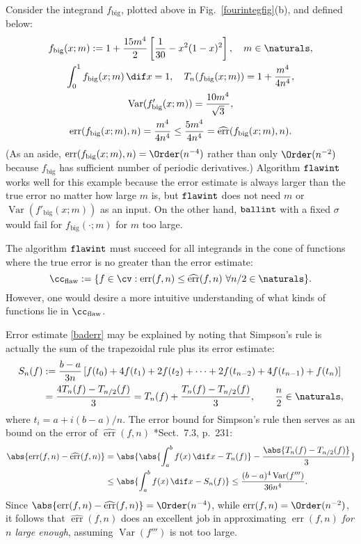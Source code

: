 \documentclass[]{article}
\DeclareMathOperator{\flawinteg}{\texttt{\textup{flawint}}}
\DeclareMathOperator{\ballinteg}{\texttt{\textup{ballint}}}
\DeclareMathOperator{\Var}{Var}
\DeclareMathOperator{\err}{err}
\newcommand{\herr}{\widehat{\err}}
\theoremstyle{definition}
\theoremstyle{remark}
\begin{document}
Consider the integrand $f_{\text{big}}$, plotted above in Fig.\ \ref{fourintegfig}(b), and defined below:
\begin{subequations} \label{fbig}
\begin{gather} 
f_{\text{big}}(x;m) :=  1 + \frac{15 m^4}{2} \left[ \frac{1}{30} - x^2(1-x)^2 \right], \quad m \in \naturals, \\
\int_0^1 f_{\text{big}}(x;m) \, \dif x =  1, \quad T_{n}(f_{\text{big}}(x;m))= 1 + \frac{m^4}{4n^4},  \\
\Var(f'_{\text{big}}(x;m)) = \frac{10 m^4}{\sqrt{3}},  \\ \err(f_{\text{big}}(x;m),n)=\frac{m^4}{4n^4} \le \frac{5m^4}{4n^4} = \herr(f_{\text{big}}(x;m),n).
\end{gather}
\end{subequations}
(As an aside, $\err(f_{\text{big}}(x;m),n) = \Order (n^{-4})$ rather than only $\Order (n^{-2})$ because $f_{\text{big}}$ has sufficient number of periodic  derivatives.)  Algorithm $\flawinteg$ works well for this example because the error estimate is always larger than the true error no matter how large $m$ is, but $\flawinteg$ does not need $m$ or $\Var(f'_{\text{big}}(x;m))$ as an input.  On the other hand, $\ballinteg$ with a fixed $\sigma$ would fail for $f_{\text{big}}(\cdot; m)$ for $m$ too large.

The algorithm $\flawinteg$ must succeed for all integrands in the cone of functions where the true error is no greater than the error estimate:
\begin{equation*} 
\cc_{\text{flaw}} : = \{f \in \cv : \err(f,n) \le \herr(f,n) \ \forall n/2 \in \naturals\}.
\end{equation*}
However, one would desire a more intuitive understanding of what kinds of functions lie in $\cc_{\text{flaw}}$.

Error estimate \eqref{baderr} may be explained by noting that Simpson's rule is actually the sum of the trapezoidal rule plus its error estimate:
\begin{align*}
S_n(f) &:= \frac{b-a}{3n} \left [ f(t_0) + 4 f(t_1) + 2 f(t_2) + \cdots  + 2 f(t_{n-2}) + 4 f(t_{n-1}) + f(t_n) \right] \\
& = \frac{4T_n(f) - T_{n/2}(f)}{3} =  T_n(f) + \frac{T_n(f) - T_{n/2}(f)}{3}, \qquad \frac n2 \in \naturals,
\end{align*}
where $t_i=a+i(b-a)/n$.  The error bound for Simpson's rule then serves as an bound on the error of $\herr(f,n)$ \cite{BraPet11a}*{Sect.\ 7.3, p.\ 231}:
\begin{align} 
\nonumber
\abs{\err(f,n) - \herr(f,n)} & = \abs{\abs{\int_a^b f(x) \, \dif x - T_n(f)} - \frac{\abs{T_n(f) - T_{n/2}(f)}}{3}} \\
& \le \abs{\int_a^b f(x) \, \dif x - S_n(f)}  \le \frac{(b-a)^4 \Var(f''')}{36n^4}. \label{Simperrbd}
\end{align}
Since $\abs{\err(f,n) - \herr(f,n)}=\Order(n^{-4})$, while $\err(f,n) = \Order(n^{-2})$, it follows that $\herr(f,n)$ does an excellent job in approximating $\err(f,n)$ \emph{for $n$ large enough}, assuming $\Var(f''')$ is not too large.
\end{document}
